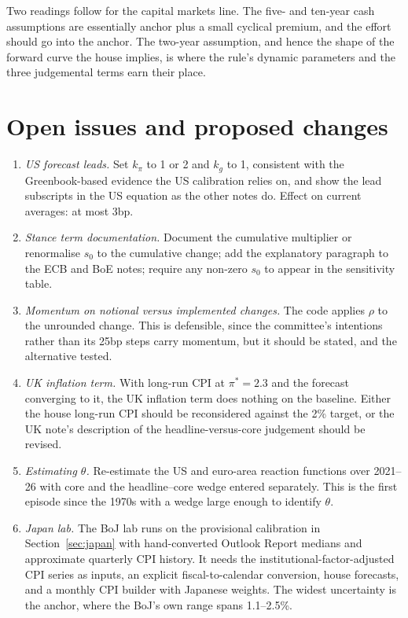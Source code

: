 \documentclass[11pt,a4paper]{article}
\newcommand{\pis}{\pi^{*}}
\begin{document}
Two readings follow for the capital markets line. The five- and ten-year cash assumptions are essentially anchor plus a small cyclical premium, and the effort should go into the anchor. The two-year assumption, and hence the shape of the forward curve the house implies, is where the rule's dynamic parameters and the three judgemental terms earn their place.

\section{Open issues and proposed changes}
\label{sec:issues}

\begin{enumerate}
\item \emph{US forecast leads.} Set $k_\pi$ to 1 or 2 and $k_g$ to 1, consistent with the Greenbook-based evidence the US calibration relies on, and show the lead subscripts in the US equation as the other notes do. Effect on current averages: at most 3bp.
\item \emph{Stance term documentation.} Document the cumulative multiplier or renormalise $s_0$ to the cumulative change; add the explanatory paragraph to the ECB and BoE notes; require any non-zero $s_0$ to appear in the sensitivity table.
\item \emph{Momentum on notional versus implemented changes.} The code applies $\rho$ to the unrounded change. This is defensible, since the committee's intentions rather than its 25bp steps carry momentum, but it should be stated, and the alternative tested.
\item \emph{UK inflation term.} With long-run CPI at $\pis=2.3$ and the forecast converging to it, the UK inflation term does nothing on the baseline. Either the house long-run CPI should be reconsidered against the 2\% target, or the UK note's description of the headline-versus-core judgement should be revised.
\item \emph{Estimating $\theta$.} Re-estimate the US and euro-area reaction functions over 2021--26 with core and the headline--core wedge entered separately. This is the first episode since the 1970s with a wedge large enough to identify $\theta$.
\item \emph{Japan lab.} The BoJ lab runs on the provisional calibration in Section~\ref{sec:japan} with hand-converted Outlook Report medians and approximate quarterly CPI history. It needs the institutional-factor-adjusted CPI series as inputs, an explicit fiscal-to-calendar conversion, house forecasts, and a monthly CPI builder with Japanese weights. The widest uncertainty is the anchor, where the BoJ's own range spans 1.1--2.5\%.

\end{enumerate}
\end{document}
